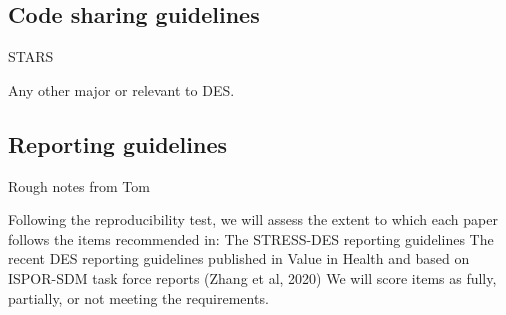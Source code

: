 \subsection{Code sharing guidelines}
\timeno

STARS

Any other major or relevant to DES.

\subsection{Reporting guidelines}
\timeno


Rough notes from Tom

Following the reproducibility test, we will assess the extent to which each paper follows the items recommended in:
The STRESS-DES reporting guidelines
The recent DES reporting guidelines published in Value in Health and based on ISPOR-SDM task force reports (Zhang et al, 2020)
We will score items as fully, partially, or not meeting the requirements.
